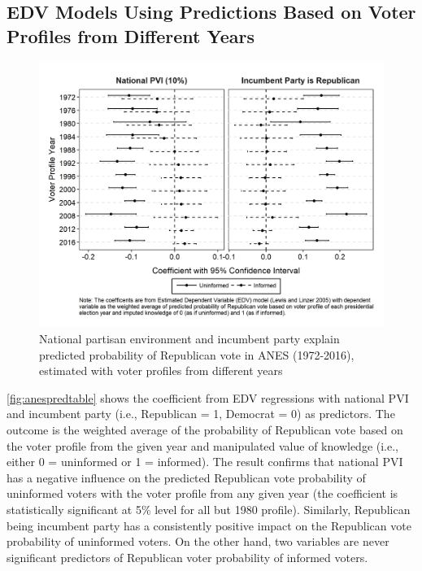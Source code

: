 \clearpage
\subsection{EDV Models Using Predictions Based on Voter Profiles from Different Years}

\begin{figure}[ht!!!]
    \caption{National partisan environment and incumbent party explain predicted probability of Republican vote in ANES (1972-2016), estimated with voter profiles from different years}
    \label{fig:anespredtable}
    \includegraphics[width=\linewidth]{../outputs/m1sq_anespredtable.png}
\end{figure}

\par \autoref{fig:anespredtable} shows the coefficient from EDV regressions with national PVI and incumbent party (i.e., Republican = 1, Democrat = 0) as predictors. The outcome is the weighted average of the probability of Republican vote based on the voter profile from the given year and manipulated value of knowledge (i.e., either 0 = uninformed or 1 = informed). The result confirms that national PVI has a negative influence on the predicted Republican vote probability of uninformed voters with the voter profile from any given year (the coefficient is statistically significant at 5\% level for all but 1980 profile). Similarly, Republican being incumbent party has a consistently positive impact on the Republican vote probability of uninformed voters. On the other hand, two variables are never significant predictors of Republican voter probability of informed voters.        

